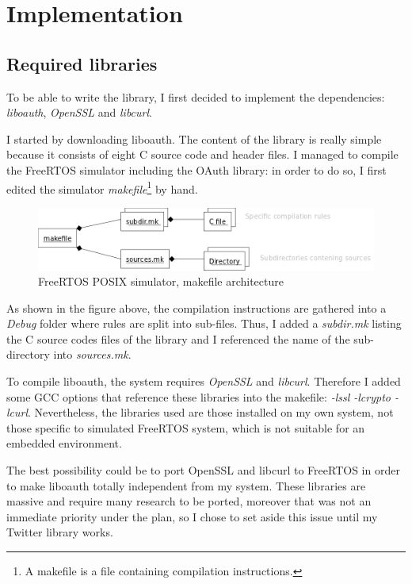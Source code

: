 \chapter{Implementation}

\section{Required libraries}

\hspace{15mm}To be able to write the library, I first decided to implement the dependencies: \textit{liboauth}, \textit{OpenSSL} and \textit{libcurl}.

I started by downloading liboauth. The content of the library is really simple because it consists of eight C source code and header files. I managed to compile the FreeRTOS simulator including the OAuth library: in order to do so, I first edited the simulator \textit{makefile}\footnote{A makefile is a file containing compilation instructions.} by hand.

\begin{figure}[h]
  \centering
  \includegraphics[scale=0.75]{images/makefile.png}
  \caption{FreeRTOS POSIX simulator, makefile architecture}
\end{figure}

As shown in the figure above, the compilation instructions are gathered into a \textit{Debug} folder where rules are split into sub-files. Thus, I added a \textit{subdir.mk} listing the C source codes files of the library and I referenced the name of the sub-directory into \textit{sources.mk}.

To compile liboauth, the system requires \textit{OpenSSL} and \textit{libcurl}. Therefore I added some GCC options that reference these libraries into the makefile: \textit{-lssl -lcrypto -lcurl}. Nevertheless, the libraries used are those installed on my own system, not those specific to simulated FreeRTOS system, which is not suitable for an embedded environment.

The best possibility could be to port OpenSSL and libcurl to FreeRTOS in order to make liboauth totally independent from my system. These libraries are massive and require many research to be ported, moreover that was not an immediate priority under the plan, so I chose to set aside this issue until my Twitter library works.


